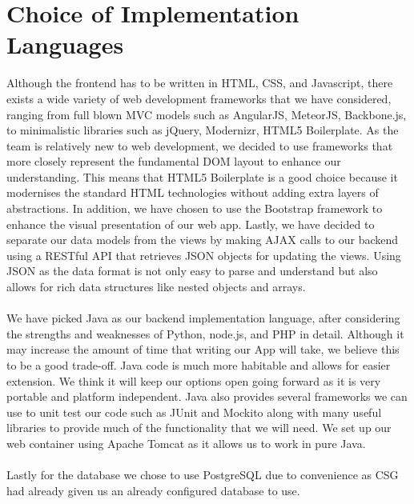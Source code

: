 \documentclass[10pt,a4paper]{article}
\begin{document}
\section{Choice of Implementation Languages}
Although the frontend has to be written in HTML, CSS, and Javascript, there exists a wide variety of web development frameworks that we have considered, ranging from full blown MVC models such as AngularJS, MeteorJS, Backbone.js, to minimalistic libraries such as jQuery, Modernizr, HTML5 Boilerplate. As the team is relatively new to web development, we decided to use frameworks that more closely represent the fundamental DOM layout to enhance our understanding. This means that HTML5 Boilerplate is a good choice because it modernises the standard HTML technologies without adding extra layers of abstractions. In addition, we have chosen to use the Bootstrap framework to enhance the visual presentation of our web app. Lastly, we have decided to separate our data models from the views by making AJAX calls to our backend using a RESTful API that retrieves JSON objects for updating the views. Using JSON as the data format is not only easy to parse and understand but also allows for rich data structures like nested objects and arrays.
\\
\\
\noindent
We have picked Java as our backend implementation language, after considering the strengths and weaknesses of Python, node.js, and PHP in detail.
Although it may increase the amount of time that writing our App will take, we believe this to be a good trade-off. Java code is much more habitable and allows for easier extension. We think it will keep our options open going forward as it is very portable and platform independent. Java also provides several frameworks we can use to unit test our code such as JUnit and Mockito along with many useful libraries to provide much of the functionality that we will need. We set up our web container using Apache Tomcat as it allows us to work in pure Java.
\\
\\
\noindent
Lastly for the database we chose to use PostgreSQL due to convenience as CSG had already given us an already configured database to use.  
\end{document}
